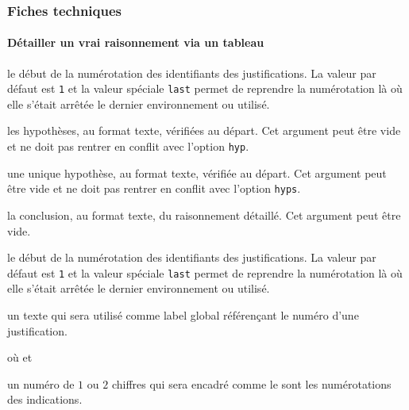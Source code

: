 \documentclass[12pt,a4paper]{article}
\begin{document}


\subsubsection{Fiches techniques}

\paragraph{Détailler un \og vrai \fg{} raisonnement via un tableau}


 le début de la numérotation des identifiants des justifications.
              La valeur par défaut est \verb+1+ et la valeur spéciale \verb+last+ permet de reprendre la numérotation là où elle s'était arrêtée le dernier environnement  ou  utilisé.

 les hypothèses, au format texte, vérifiées au départ.
             Cet argument peut être vide et ne doit pas rentrer en conflit avec l'option \verb+hyp+.

 une unique hypothèse, au format texte, vérifiée au départ.
            Cet argument peut être vide et ne doit pas rentrer en conflit avec l'option \verb+hyps+.

 la conclusion, au format texte, du raisonnement détaillé.
            Cet argument peut être vide.


\separation



 le début de la numérotation des identifiants des justifications.
              La valeur par défaut est \verb+1+ et la valeur spéciale \verb+last+ permet de reprendre la numérotation là où elle s'était arrêtée le dernier environnement  ou  utilisé.


\separation



\IDoption{} un texte qui sera utilisé comme label global référençant le numéro d'une justification.


\separation


 où \quad {}
                            et 

\IDarg{} un numéro de $1$ ou $2$ chiffres qui sera encadré comme le sont les numérotations des indications.
\end{document}
